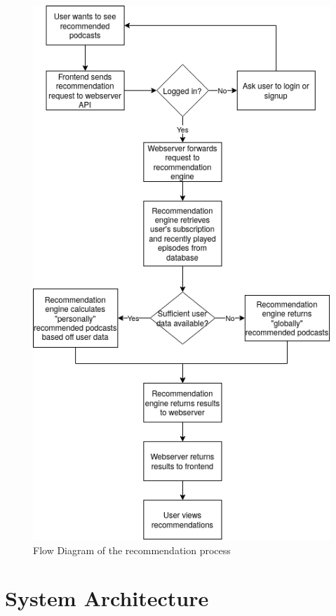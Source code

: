 \documentclass[12pt]{article}
\begin{document}
\begin{figure}
    \centering
    \includegraphics[height=0.5\paperheight]{resources/recommendation_engine}
    \caption{Flow Diagram of the recommendation process}
    \label{fig:recommendation_engine_flowchart}
\end{figure}

\section{System Architecture}
\end{document}
